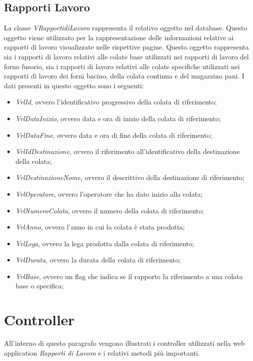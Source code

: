   \subsection{Rapporti Lavoro}
  La classe \textit{VRapportidiLavoro} rappresenta il relativo oggetto nel database. Questo oggetto viene utilizzato per la
  rappresentazione delle informazioni relative ai rapporti di lavoro visualizzate nelle rispettive pagine.
  Questo oggetto rappresenta sia i rapporti di lavoro relativi alle colate base utilizzati nei rapporti di lavoro del forno
  fusorio, sia i rapporti di lavoro relativi alle colate specifiche utilizzati nei rapporti di lavoro dei forni bacino, della
  colata continua e del magazzino pani. I dati presenti in questo oggetto sono i seguenti:
  \begin{itemize}
    \item \textit{VrlId}, ovvero l'identificativo progressivo della colata di riferimento;
    \item \textit{VrlDataInizio}, ovvero data e ora di inizio della colata di riferimento;
    \item \textit{VrlDataFine}, ovvero data e ora di fine della colata di riferimento;
    \item \textit{VrlIdDestinazione}, ovvero il riferimento all'identificativo della destinazione della colata;
    \item \textit{VrlDestinazioneNome}, ovvero il descrittivo della destinazione di riferimento;
    \item \textit{VrlOperatore}, ovvero l'operatore che ha dato inizio alla colata;
    \item \textit{VrlNumeroColata}, ovvero il numero della colata di riferimento;
    \item \textit{VrlAnno}, ovvero l'anno in cui la colata è stata prodotta;
    \item \textit{VrlLega}, ovvero la lega prodotta dalla colata di riferimento;
    \item \textit{VrlDurata}, ovvero la durata della colata di riferimento;
    \item \textit{VrlBase}, ovvero un flag che indica se il rapporto fa riferimento a una colata base o specifica;
  \end{itemize}
  
  
  \section{Controller}
  All'interno di questo paragrafo vengono illustrati i controller utilizzati nella web application \textit{Rapporti di Lavoro}
  e i relativi metodi più importanti.

